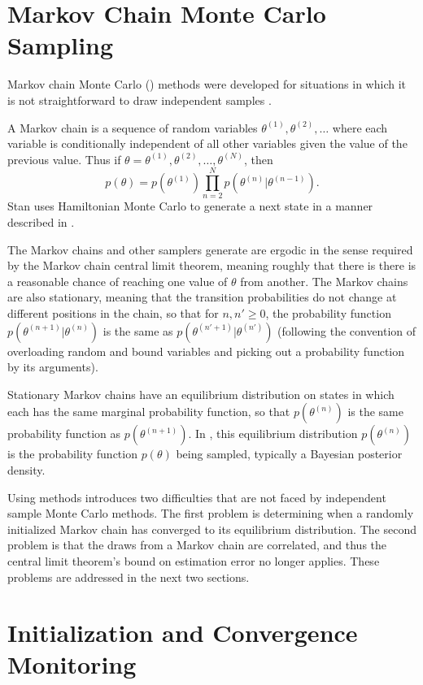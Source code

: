 \section{Markov Chain Monte Carlo Sampling}

Markov chain Monte Carlo (\MCMC) methods were developed for situations
in which it is not straightforward to draw independent samples
\citep{Metropolis:1953}.

A Markov chain is a sequence of random variables $\theta^{(1)},
\theta^{(2)},\ldots$ where each variable is conditionally independent
of all other variables given the value of the previous value.  Thus if
$\theta = \theta^{(1)}, \theta^{(2)},\ldots, \theta^{(N)}$, then
\[
p(\theta) = p(\theta^{(1)}) \prod_{n=2}^N p(\theta^{(n)}|\theta^{(n-1)}).
\]
Stan uses Hamiltonian Monte Carlo to generate a next state in a manner
described in .

The Markov chains \Stan and other \MCMC samplers generate are ergodic
in the sense required by the Markov chain central limit theorem,
meaning roughly that there is there is a reasonable chance of reaching
one value of $\theta$ from another.  The Markov chains are also
stationary, meaning that the transition probabilities do not change at
different positions in the chain, so that for $n, n' \geq 0$, the
probability function $p(\theta^{(n+1)}|\theta^{(n)})$ is the same as
$p(\theta^{(n'+1)}|\theta^{(n')})$ (following the convention of
overloading random and bound variables and picking out a probability
function by its arguments).

Stationary Markov chains have an equilibrium distribution on states in
which each has the same marginal probability function, so that
$p(\theta^{(n)})$ is the same probability function as
$p(\theta^{(n+1)})$.  In \Stan, this equilibrium distribution
$p(\theta^{(n)})$ is the probability function $p(\theta)$ being
sampled, typically a Bayesian posterior density.

Using \MCMC methods introduces two difficulties that are not faced by
independent sample Monte Carlo methods.  The first problem is determining
when a randomly initialized Markov chain has converged to its
equilibrium distribution.  The second problem is that the draws from a
Markov chain are correlated, and thus the central limit theorem's
bound on estimation error no longer applies.  These problems are
addressed in the next two sections.


\section{Initialization and Convergence Monitoring}\label{convergence.section}

